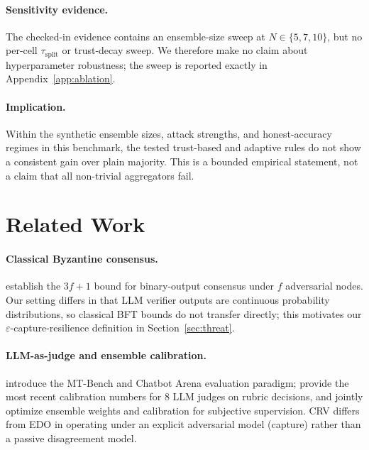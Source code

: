 \documentclass[11pt]{article}
\begin{document}
\paragraph{Sensitivity evidence.}
The checked-in evidence contains an ensemble-size sweep at $N\in\{5,7,10\}$,
but no per-cell $\tau_{\text{split}}$ or trust-decay sweep. We therefore make
no claim about hyperparameter robustness; the sweep is reported exactly in
Appendix~\ref{app:ablation}.

\paragraph{Implication.}
Within the synthetic ensemble sizes, attack strengths, and honest-accuracy
regimes in this benchmark, the tested trust-based and adaptive rules do not
show a consistent gain over plain majority. This is a bounded empirical
statement, not a claim that all non-trivial aggregators fail.

\section{Related Work}
\label{sec:related}


\paragraph{Classical Byzantine consensus.}
\citet{lamport1982byzantine,castro1999pbft,yin2019hotstuff} establish the
$3f+1$ bound for binary-output consensus under $f$ adversarial nodes. Our
setting differs in that LLM verifier outputs are continuous probability
distributions, so classical BFT bounds do not transfer directly; this
motivates our $\varepsilon$-capture-resilience definition in
Section~\ref{sec:threat}.

\paragraph{LLM-as-judge and ensemble calibration.}
\citet{zheng2023judging} introduce the MT-Bench and Chatbot Arena
evaluation paradigm; \citet{leung2026rubricllm} provide the most recent
calibration numbers for 8 LLM judges on rubric decisions, and
\citet{cui2026edo} jointly optimize ensemble weights and calibration for
subjective supervision. CRV differs from EDO in operating under an
explicit adversarial model (capture) rather than a passive disagreement
model.
\end{document}

